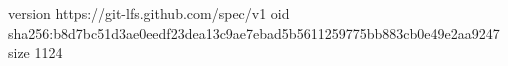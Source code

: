 version https://git-lfs.github.com/spec/v1
oid sha256:b8d7bc51d3ae0eedf23dea13c9ae7ebad5b5611259775bb883cb0e49e2aa9247
size 1124
